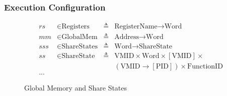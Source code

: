 \documentclass{beamer}
\newcommand*{\defined}{\triangleq}
\newcommand*{\maps}{\rightarrow}
\newcommand*{\derived}{::=}
\newcommand*{\MEM}{\text{GlobalMem}}
\newcommand*{\SSS}{\text{ShareStates}}
\newcommand*{\PID}{\text{PID}}
\newcommand*{\REGS}{\text{Registers}}
\newcommand*{\ADDR}{\text{Address}}
\newcommand*{\WORD}{\text{Word}}
\newcommand*{\VMID}{\text{VMID}}
\newcommand*{\REGNAMES}{\text{RegisterName}}
\newcommand*{\MODE}{\text{ExecMode}}
\newcommand*{\DONE}{\text{DoneState}}
\newcommand*{\INSTR}{\text{Instruction}}
\newcommand*{\instrm}[1]{\mathtt{#1}}
\newcommand*{\NXT}[1]{\mathtt{Next} \; {#1}}
\begin{document}
\begin{frame}
  \frametitle{Execution Configuration}
\begin{figure}
  \begin{align*}
      rs & \in \REGS &\defined  &\REGNAMES \maps \WORD \\
    mm & \in \MEM &\defined  &\ADDR \maps \WORD \\
    sss & \in \SSS &\defined  &\WORD \maps \text{ShareState} \\
    ss & \in \text{ShareState} &\defined &\VMID \times \WORD \times [\VMID] \times\\
    &&&(\VMID \maps [\PID]) \times \text{FunctionID}\\
    ...
  \end{align*}
  \caption{Global Memory and Share States}
\end{figure}

\end{frame}


\end{document}
